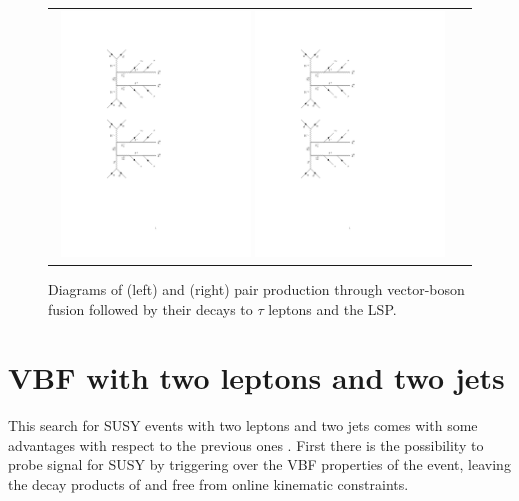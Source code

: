 \begin{figure}[tbh!]
	\centering
	\begin{tabular}{cc}
		\includegraphics[width=0.48\textwidth]{diagrams/pics/signal_C1N2.pdf}
		\includegraphics[width=0.48\textwidth]{diagrams/pics/signal_C1C1.pdf} 		
	\end{tabular}
	\caption{Diagrams of (left) \charginopm \neutralinotwo and (right) \charginopm \charginomp pair production through vector-boson fusion followed by their decays to $\tau$ leptons and the LSP.}
	\label{fig:VBF_diagrams}
\end{figure}

\section{VBF with two leptons and two jets}

This search for SUSY events with two leptons and two jets comes with some advantages with respect to the previous ones \cite{Dutta:2012xe}. First there is the possibility to probe signal for SUSY by triggering over the VBF properties of the event, leaving the decay products of \charginopm and \neutralinotwo free from online kinematic constraints.

